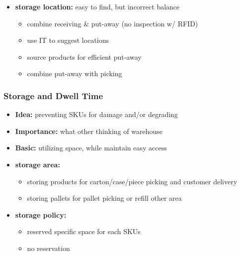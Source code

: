 \documentclass[10pt,handout,notes=show]{beamer}
\begin{document}
\begin{frame}
{    \begin{itemize}
      \item \textbf{storage location:} easy to find, but incorrect balance
      \begin{itemize}
        \item {} combine receiving \& put-away (no inspection w/ RFID)
        \item {} use IT to suggest locations
        \item {} source products for efficient put-away
        \item {} combine put-away with picking  \NextHalfLine
      \end{itemize}
    \end{itemize}
  }
\end{frame}

\begin{frame}
  \frametitle{Storage and Dwell Time}

    \begin{itemize}
      \item \textbf{Idea:} preventing SKUs for damage and/or degrading
      \item \textbf{Importance:} what other thinking of warehouse
      \item \textbf{Basic:} utilizing space, while maintain easy access
      \item \textbf{storage area:}
      \begin{itemize}
        \item {} storing \alert{products} for carton/case/piece picking and customer delivery
        \item {} storing  \alert{pallets} for pallet picking or refill other area
      \end{itemize}
      \item \textbf{storage policy:}
      \begin{itemize}
        \item {} reserved \alert{specific space} for each SKUs
        \item {} \alert{no reservation} \NextHalfLine
      \end{itemize}
    \end{itemize}


\end{frame}
\end{document}

